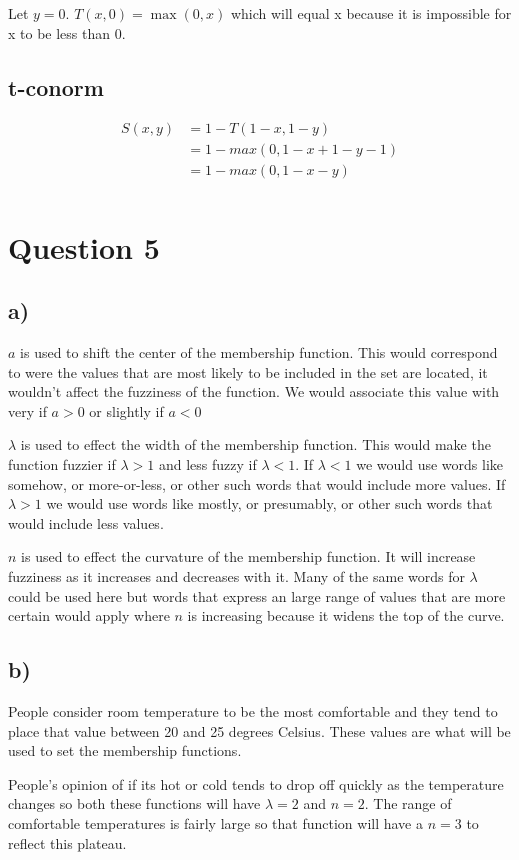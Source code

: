 \documentclass{article}
\begin{document}
Let $y=0$. $T(x,0) = \max(0, x)$ which will equal x because it is impossible for x to be less than 0.

\subsection*{t-conorm}
\begin{align*}
	S(x,y) &= 1-T(1-x, 1-y)\\
			&= 1-max(0, 1-x+1-y-1)\\
			&= 1-max(0, 1-x-y)\\
\end{align*}

\section*{Question 5}
\subsection*{a)}
$a$ is used to shift the center of the membership function. This would correspond to were the values that are most likely to be included in the set are located, it wouldn't affect the fuzziness of the function. We would associate this value with very if $a > 0$ or slightly if $a < 0$

$\lambda$ is used to effect the width of the membership function. This would make the function fuzzier if $\lambda > 1$ and less fuzzy if $\lambda < 1$. If $\lambda < 1$ we would use words like somehow, or more-or-less, or other such words that would include more values. If $\lambda > 1$ we would use words like mostly, or presumably, or other such words that would include less values.

$n$ is used to effect the curvature of the membership function. It will increase fuzziness as it increases and decreases with it. Many of the same words for $\lambda$ could be used here but words that express an large range of values that are more certain would apply where $n$ is increasing because it widens the top of the curve.

\subsection*{b)}
People consider room temperature to be the most comfortable and they tend to place that value between 20 and 25 degrees Celsius. These values are what will be used to set the membership functions.

People's opinion of if its hot or cold tends to drop off quickly as the temperature changes so both these functions will have $\lambda = 2$ and $n = 2$. The range of comfortable temperatures is fairly large so that function will have a $n = 3$ to reflect this plateau.
\end{document}
